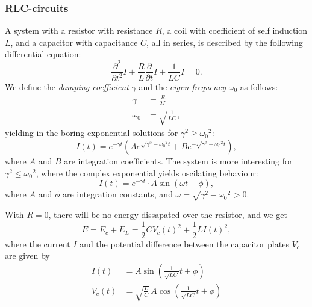     \subsubsection{RLC-circuits}
        A system with a resistor with resistance $R$, a coil with coefficient of self induction $L$, and a capacitor with capacitance $C$, 
        all in series, is described by the following differential equation: 
        \begin{equation} \label{Current in RLC}
            \frac{\partial^2}{\partial t^2}I + \frac{R}{L}\frac{\partial}{\partial t}I + \frac{1}{LC}I = 0.
        \end{equation}
        We define the \textit{damping coefficient} $\gamma$ and the \textit{eigen frequency} $\omega_0$ as follows:
        \begin{align*}
            \gamma &= \frac{R}{2L}\\
            \omega_0 &= \sqrt{\frac{1}{LC}},
        \end{align*}
        yielding in the boring exponential solutions for $\gamma^2 \geq {\omega_0}^2$:
        \begin{equation}
            I(t) = e^{-\gamma t}\left(Ae^{\sqrt{\gamma^2 - {\omega_0}^2}t}+Be^{-\sqrt{\gamma^2 - {\omega_0}^2}t}\right),
        \end{equation}
        where $A$ and $B$ are integration coefficients. The system is more interesting for $\gamma^2 \leq {\omega_0}^2$,
        where the complex exponential yields oscilating behaviour:
        \begin{equation}
            I(t) = e^{-\gamma t}\cdot A\sin\left(\omega t + \phi\right),
        \end{equation}
        where $A$ and $\phi$ are integration constants, and $\omega = \sqrt{\gamma^2 - {\omega_0}^2} > 0$.

        With $R=0$, there will be no energy dissapated over the resistor, and we get 
        \begin{equation*}
            E = E_c + E_L = \frac{1}{2}C{V_c(t)}^2 + \frac{1}{2}L{I(t)}^2,
        \end{equation*}
        where the current $I$ and the potential difference between the capacitor plates $V_c$ are given by 
        \begin{align*}
            I(t) &= A\sin\left(\frac{1}{\sqrt{LC}}t + \phi\right) \\
            V_c (t) &= \sqrt{\frac{L}{C}} \, A\cos\left(\frac{1}{\sqrt{LC}}t + \phi\right)
        \end{align*}

